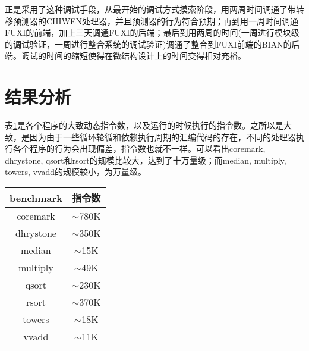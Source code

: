 正是采用了这种调试手段，从最开始的调试方式摸索阶段，用两周时间调通了带转移预测器的CHIWEN处理器，并且预测器的行为符合预期；再到用一周时间调通FUXI的前端，加上三天调通FUXI的后端；最后到用两周的时间(一周进行模块级的调试验证，一周进行整合系统的调试验证)调通了整合到FUXI前端的BIAN的后端。调试的时间的缩短使得在微结构设计上的时间变得相对充裕。

\section{结果分析}
表\ref{tab:inst_number}是各个程序的大致动态指令数，以及运行的时候执行的指令数。之所以是大致，是因为由于一些循环轮循和依赖执行周期的汇编代码的存在，不同的处理器执行各个程序的行为会出现偏差，指令数也就不一样。可以看出coremark, dhrystone, qsort和rsort的规模比较大，达到了十万量级；而median, multiply, towers, vvadd的规模较小，为万量级。
\begin{table}[!htbp]
	\label{tab:inst_number}
	\centering
	\footnotesize%
	\setlength{\tabcolsep}{4pt}%
	\renewcommand{\arraystretch}{1.2}%
	\begin{tabular}{cc}
		\hline
		benchmark & 指令数 \\%
		\hline
		coremark    & $ \sim $780K\\
		dhrystone   & $ \sim $350K\\
		median 		& $ \sim $15K\\
		multiply 	& $ \sim $49K\\
		qsort  		& $ \sim $230K\\
		rsort  		& $ \sim $370K\\
		towers 		& $ \sim $18K\\
		vvadd 		& $ \sim $11K\\
		\hline
	\end{tabular}
\end{table}

